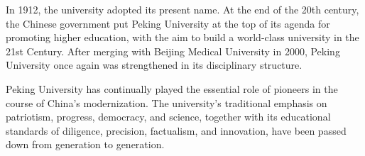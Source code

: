 In 1912, the university adopted its present name. At the end of the 20th century, the Chinese government put Peking University at the top of its agenda for promoting higher education, with the aim to build a world-class university in the 21st Century. After merging with Beijing Medical University in 2000, Peking University once again was strengthened in its disciplinary structure. 

Peking University has continually played the essential role of pioneers in the course of China's modernization. The university's traditional emphasis on patriotism, progress, democracy, and science, together with its educational standards of diligence, precision, factualism, and innovation, have been passed down from generation to generation. 

